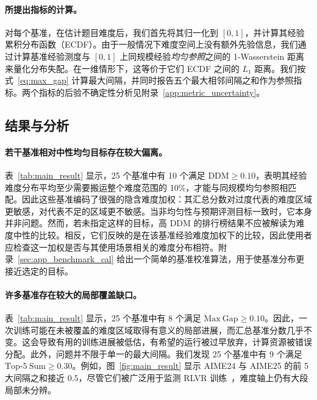 
\paragraph{所提出指标的计算。}
对每个基准，在估计题目难度后，我们首先将其归一化到 $[0,1]$，并计算其经验累积分布函数（ECDF）。由于一般情况下难度空间上没有额外先验信息，我们通过计算基准经验测度与 $[0,1]$ 上同规模经验\textit{均匀参照}之间的 1-Wasserstein 距离来量化分布失配。在一维情形下，这等价于它们 ECDF 之间的 $L_1$ 距离。我们按式~\eqref{eq:max_gap} 计算最大间隔，并同时报告五个最大相邻间隔之和作为参照指标。两个指标的后验不确定性分析见附录~\ref{app:metric_uncertainty}。

\subsection{结果与分析}

\paragraph{若干基准相对中性均匀目标存在较大偏离。} 表~\ref{tab:main_result} 显示，25 个基准中有 10 个满足 $\mathrm{DDM}\ge 0.10$，表明其经验难度分布平均至少需要搬运整个难度范围的 10\%，才能与同规模均匀参照相匹配。因此这些基准编码了很强的隐含难度加权：其汇总分数对过度代表的难度区域更敏感，对代表不足的区域更不敏感。当非均匀性与预期评测目标一致时，它本身并非问题。然而，若未指定这样的目标，高 DDM 的排行榜结果不应被解读为难度中性的比较。相反，它们反映的是在该基准经验难度加权下的比较，因此使用者应检查这一加权是否与其使用场景相关的难度分布相符。附录~\ref{sec:app_benchmark_cal} 给出一个简单的基准校准算法，用于使基准分布更接近选定的目标。

\paragraph{许多基准存在较大的局部覆盖缺口。}
表~\ref{tab:main_result} 显示，25 个基准中有 8 个满足 $\mathrm{Max\ Gap}\ge 0.10$。因此，一次训练可能在未被覆盖的难度区域取得有意义的局部进展，而汇总基准分数几乎不变。这会导致有用的训练进展被低估，有希望的运行被过早放弃，计算资源被错误分配。此外，问题并不限于单一的最大间隔。我们发现 25 个基准中有 9 个满足 $\mathrm{Top\text{-}5\ Sum}\ge 0.30$。例如，图~\ref{fig:main_result} 显示 AIME24 与 AIME25 的前 5 大间隔之和接近 $0.5$，尽管它们被广泛用于监测 RLVR 训练~\cite{luo2025deepscaler,liu2025prorl,guo2025deepseek,yue2025vapo}，难度轴上仍有大段局部未分辨。

